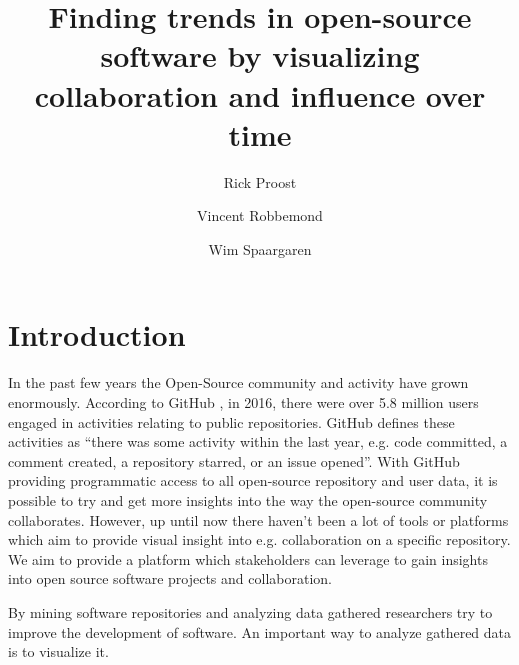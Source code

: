 \documentclass[acmtog, authorversion]{acmart}
\begin{document}
\title{Finding trends in open-source software by visualizing collaboration and influence over time} 

\author{Rick Proost}

\author{Vincent Robbemond}

\author{Wim Spaargaren}

\maketitle

\begin{abstract}
	
\end{abstract}

\section{Introduction}
In the past few years the Open-Source community and activity have grown enormously. According to GitHub \cite{GHOctoverse}, in 2016, there were over 5.8 million users engaged in activities relating to public repositories. GitHub defines these activities as “there was some activity within the last year, e.g. code committed, a comment created, a repository starred, or an issue opened”. With GitHub providing programmatic access to all open-source repository and user data, it is possible to try and get more insights into the way the open-source community collaborates. However, up until now there haven’t been a lot of tools or platforms which aim to provide visual insight into e.g. collaboration on a specific repository. 
We aim to provide a platform which stakeholders can leverage to gain insights into open source software projects and collaboration.

By mining software repositories and analyzing data gathered researchers try to improve the development of software. An important way to analyze gathered data is to visualize it. 
\end{document}
